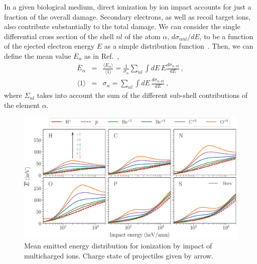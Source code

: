 \documentclass[preprint,12pt]{article}
\begin{document}
In a given biological medium, direct ionization by ion impact accounts 
for just a fraction of the overall damage. Secondary electrons, as well 
as recoil target ions, also contribute substantially to the total damage. 
We can consider the single differential cross section of the shell 
$nl$ of the atom $\alpha$, $d\sigma_{\alpha nl}/dE$, to be a function 
of the ejected electron energy $E$ as a simple distribution 
function~\cite{surdutovic2018}. Then, we can define the mean value 
$\overline{E}_{\alpha}$ as in Ref.~\cite{abril2015},
\begin{eqnarray}
\overline{E}_{\alpha} &=&\frac{\langle E_{\alpha}\rangle}{\langle
1\rangle}=\frac{1}{\sigma_{\alpha}}\sum\limits_{nl}\int dE\,E
\frac{d\sigma_{\alpha,nl}}{dE}\,,  
\label{40} \\
\langle 1\rangle &=&\sigma_{\alpha}=\sum\limits_{nl}\int dE\,
\frac{d\sigma_{\alpha,nl}}{dE}\,,  
\label{50}
\end{eqnarray}
where $\Sigma_{nl}$ takes into account the sum of the different 
sub-shell contributions of the element $\alpha$.

\begin{figure}[t!]
\centering
\includegraphics[width=\textwidth]{figuras/ener_mean.eps}
\caption{Mean emitted energy distribution for ionization by impact of
multicharged ions. Charge state of projectiles given by arrow.}
\label{fig:emittedener}
\end{figure} 
\end{document}
